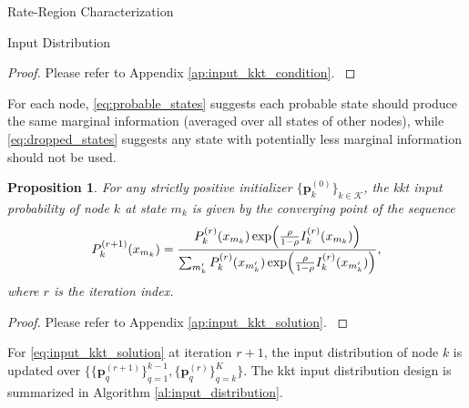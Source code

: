 \documentclass[journal]{IEEEtran}
\newtheorem{proposition}{Proposition}
\begin{document}
\begin{section}{Rate-Region Characterization}
\begin{subsection}{Input Distribution}
		\begin{proof}
			Please refer to Appendix \ref{ap:input_kkt_condition}.
			\label{pf:input_kkt_condition}
		\end{proof}

		For each node, \eqref{eq:probable_states} suggests each probable state should produce the same marginal information (averaged over all states of other nodes), while \eqref{eq:dropped_states} suggests any state with potentially less marginal information should not be used.
		\begin{proposition}
			For any strictly positive initializer $\{\boldsymbol{p}_k^{(0)}\}_{k \in \mathcal{K}}$, the \gls{kkt} input probability of node $k$ at state $m_k$ is given by the converging point of the sequence
			\begin{equation}
				P_k^{(r+1)}(x_{m_k}) = \frac{P_k^{(r)}(x_{m_k}) \exp \Bigl( \frac{\rho}{1 - \rho} I_k^{(r)}(x_{m_k}) \Bigr)}{\sum_{m_k'} P_k^{(r)}(x_{m_k'}) \exp \Bigl( \frac{\rho}{1 - \rho} I_k^{(r)}(x_{m_k'}) \Bigr)},
				\label{eq:input_kkt_solution}
			\end{equation}
			where $r$ is the iteration index.
			\label{pr:input_kkt_solution}
		\end{proposition}
		\begin{proof}
			Please refer to Appendix \ref{ap:input_kkt_solution}.
			\label{pf:input_kkt_solution}
		\end{proof}

		For \eqref{eq:input_kkt_solution} at iteration $r+1$, the input distribution of node $k$ is updated over $\bigl\{\{\boldsymbol{p}_q^{(r+1)}\}_{q=1}^{k-1},\{\boldsymbol{p}_q^{(r)}\}_{q=k}^{K}\bigr\}$.
		The \gls{kkt} input distribution design is summarized in Algorithm \ref{al:input_distribution}.


\end{subsection}
\end{section}
\end{document}
